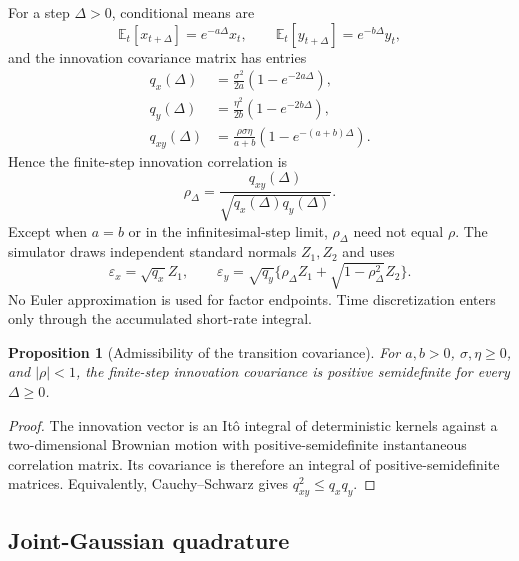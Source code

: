 \documentclass[11pt]{article}
\numberwithin{equation}{section}
\newtheorem{proposition}{Proposition}[section]
\theoremstyle{definition}
\theoremstyle{remark}
\begin{document}
For a step $\Delta>0$, conditional means are
\[
  \mathbb{E}_t[x_{t+\Delta}]=e^{-a\Delta}x_t,\qquad
  \mathbb{E}_t[y_{t+\Delta}]=e^{-b\Delta}y_t,
\]
and the innovation covariance matrix has entries
\begin{align}
  q_x(\Delta)&=\frac{\sigma^2}{2a}(1-e^{-2a\Delta}),\\
  q_y(\Delta)&=\frac{\eta^2}{2b}(1-e^{-2b\Delta}),\\
  q_{xy}(\Delta)&=\frac{\rho\sigma\eta}{a+b}
     (1-e^{-(a+b)\Delta}).
\end{align}
Hence the finite-step innovation correlation is
\begin{equation}
  \rho_\Delta=\frac{q_{xy}(\Delta)}
  {\sqrt{q_x(\Delta)q_y(\Delta)}}.
\end{equation}
Except when $a=b$ or in the infinitesimal-step limit,
$\rho_\Delta$ need not equal $\rho$. The simulator draws independent standard
normals $Z_1,Z_2$ and uses
\[
  \varepsilon_x=\sqrt{q_x}Z_1,\qquad
  \varepsilon_y=\sqrt{q_y}
  \{\rho_\Delta Z_1+\sqrt{1-\rho_\Delta^2}Z_2\}.
\]
No Euler approximation is used for factor endpoints. Time discretization enters
only through the accumulated short-rate integral.

\begin{proposition}[Admissibility of the transition covariance]
For $a,b>0$, $\sigma,\eta\geq0$, and $|\rho|<1$, the finite-step innovation
covariance is positive semidefinite for every $\Delta\geq0$.
\end{proposition}
\begin{proof}
The innovation vector is an It\^o integral of deterministic kernels against a
two-dimensional Brownian motion with positive-semidefinite instantaneous
correlation matrix. Its covariance is therefore an integral of
positive-semidefinite matrices. Equivalently, Cauchy--Schwarz gives
$q_{xy}^2\le q_xq_y$.
\end{proof}

\subsection{Joint-Gaussian quadrature}
\end{document}
